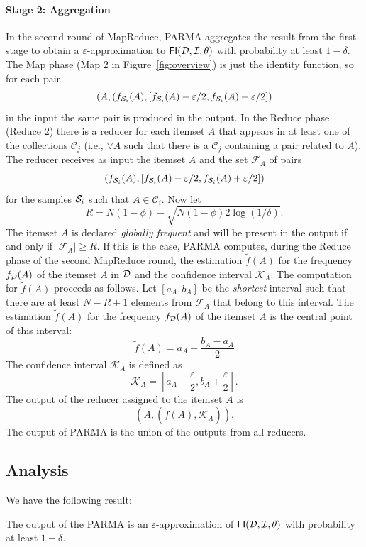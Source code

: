 \paragraph*{Stage 2: Aggregation} In the second round of MapReduce, PARMA
aggregates the result from the first stage to obtain a
$\varepsilon$-approximation to $\mathsf{FI}({\cal D},{\cal I},\theta)$ with probability at least
$1-\delta$. The Map phase (Map 2 in Figure~\ref{fig:overview}) is just the identity
function, so for each pair 
\[(A,
(f_{{\cal S}_i}(A),[f_{{\cal S}_i}(A)-\varepsilon/2,f_{{\cal S}_i}(A)+\varepsilon/2])\]
in the input the same pair is produced in the output. In the Reduce phase (Reduce 2) there
is a reducer for each itemset $A$ that appears in at least one of the
collections $\mathcal{C}_j$ (i.e., $\forall A$ such that there is a
$\mathcal{C}_j$ containing a pair related to $A$). The reducer receives as input
the itemset $A$ and the set $\mathcal{F}_A$ of pairs
\[
(f_{{\cal S}_i}(A),[f_{{\cal S}_i}(A)-\varepsilon/2,f_{{\cal S}_i}(A)+\varepsilon/2])\]
for the samples ${\cal S}_i$ such that $A\in\mathcal{C}_i$.
Now let
\begin{equation}\label{eq:Rdef}
R = N(1-\phi)-\sqrt{N(1-\phi)2\log(1/\delta)}.
\end{equation}
The itemset $A$ is declared
\emph{globally frequent} and will be present in the output if and only if
$|\mathcal{F}_A| \ge R$. If this is the case, PARMA computes, during the Reduce
phase of the second MapReduce round, the estimation $\tilde{f}(A)$ for the
frequency $f_{\cal D}(A)$ of the itemset $A$ in ${\cal D}$ and the confidence interval
$\mathcal{K}_A$. The computation for $\tilde{f}(A)$ proceeds as follows. Let
$[a_A,b_A]$ be the \emph{shortest} interval such that
there are at least $N-R+1$ elements from $\mathcal{F}_A$ that belong to this
interval. The estimation $\tilde{f}(A)$ for the frequency $f_{\cal D}(A)$ of the
itemset $A$ is the central point of this interval:
\[ \tilde{f}(A)=a_A+\frac{b_A-a_A}{2}\]
The confidence interval $\mathcal{K}_A$ is defined as
\[ \mathcal{K}_A=\left[a_A-\frac{\varepsilon}{2},b_A+\frac{\varepsilon}{2}\right].\]
The output of the reducer assigned to the itemset $A$ is \[(A,(\tilde{f}(A),\mathcal{K}_A)).\]
The output of PARMA is the union of the outputs from all reducers.

\subsection{Analysis}
We have the following result:
\begin{lemma}\label{lem:multiepsapprox}
 The output of the PARMA is an $\varepsilon$-approximation of
 $\mathsf{FI}({\cal D},{\cal I},\theta)$ with probability at least $1-\delta$.
\end{lemma}

